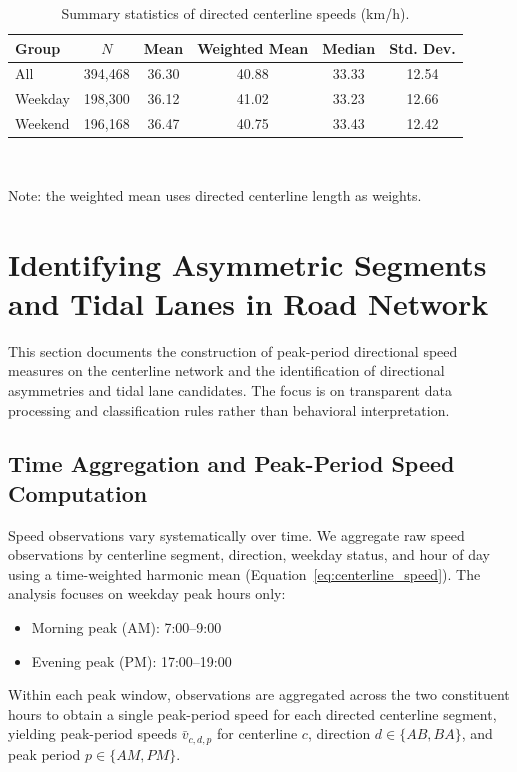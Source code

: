 \documentclass[12pt]{article}
\begin{document}
	\begin{table}[h!]
		\centering
		\caption{Summary statistics of directed centerline speeds (km/h).}
		\label{tab:centerline-speed-stats}
		\begin{tabular}{lccccc}
			\toprule
			Group & $N$ & Mean & Weighted Mean & Median & Std. Dev. \\
			\midrule
			All & 394,468 & 36.30 & 40.88 & 33.33 & 12.54 \\
			Weekday & 198,300 & 36.12 & 41.02 & 33.23 & 12.66 \\
			Weekend & 196,168 & 36.47 & 40.75 & 33.43 & 12.42 \\
			\bottomrule
		\end{tabular} \\
		\vspace{0.3em}
		{\footnotesize\raggedright
			Note: the weighted mean uses directed centerline length as weights.
		}
	\end{table}
	
	\clearpage

	
	\section{Identifying Asymmetric Segments and Tidal Lanes in Road Network}
	\label{sec:asym_sec}
	This section documents the construction of peak-period directional speed measures on the centerline network and the identification of directional asymmetries and tidal lane candidates. The focus is on transparent data processing and classification rules rather than behavioral interpretation.
	
	\subsection{Time Aggregation and Peak-Period Speed Computation}
	
	Speed observations vary systematically over time. We aggregate raw speed observations by centerline segment, direction, weekday status, and hour of day using a time-weighted harmonic mean (Equation~\eqref{eq:centerline_speed}). The analysis focuses on weekday peak hours only:
	\begin{itemize}
		\item Morning peak (AM): 7:00--9:00
		\item Evening peak (PM): 17:00--19:00
	\end{itemize}
	Within each peak window, observations are aggregated across the two constituent hours to obtain a single peak-period speed for each directed centerline segment, yielding peak-period speeds $\bar{v}_{c,d,p}$ for centerline $c$, direction $d \in \{AB, BA\}$, and peak period $p \in \{AM, PM\}$.
	
\end{document}
